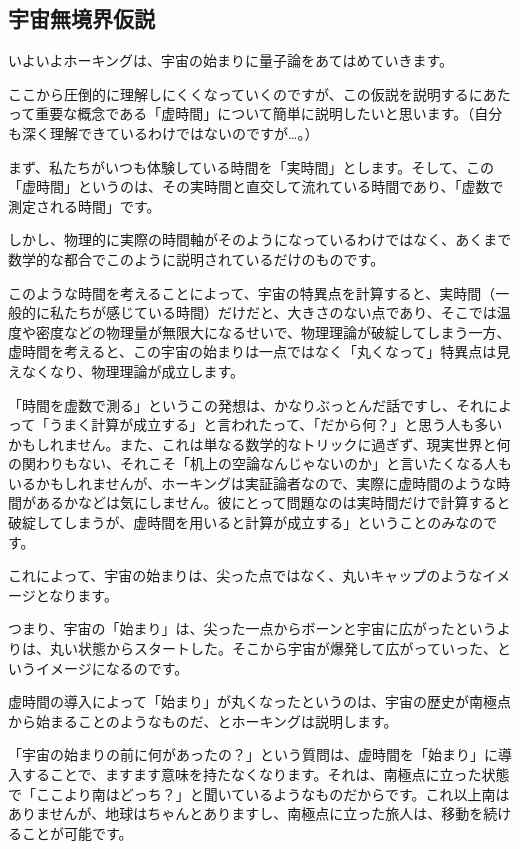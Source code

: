\documentclass[10pt,b5paper,papersize,dvipdfmx]{jsbook}
\begin{document}
\subsection{宇宙無境界仮説}
いよいよホーキングは、宇宙の始まりに量子論をあてはめていきます。\par
ここから圧倒的に理解しにくくなっていくのですが、この仮説を説明するにあたって重要な概念である「虚時間」について簡単に説明したいと思います。（自分も深く理解できているわけではないのですが…。）\par
まず、私たちがいつも体験している時間を「実時間」とします。そして、この「虚時間」というのは、その実時間と直交して流れている時間であり、「虚数で測定される時間」です。\par
しかし、物理的に実際の時間軸がそのようになっているわけではなく、あくまで数学的な都合でこのように説明されているだけのものです。\par
このような時間を考えることによって、宇宙の特異点を計算すると、実時間（一般的に私たちが感じている時間）だけだと、大きさのない点であり、そこでは温度や密度などの物理量が無限大になるせいで、物理理論が破綻してしまう一方、虚時間を考えると、この宇宙の始まりは一点ではなく「丸くなって」特異点は見えなくなり、物理理論が成立します。\par
「時間を虚数で測る」というこの発想は、かなりぶっとんだ話ですし、それによって「うまく計算が成立する」と言われたって、「だから何？」と思う人も多いかもしれません。また、これは単なる数学的なトリックに過ぎず、現実世界と何の関わりもない、それこそ「机上の空論なんじゃないのか」と言いたくなる人もいるかもしれませんが、ホーキングは実証論者なので、実際に虚時間のような時間があるかなどは気にしません。彼にとって問題なのは実時間だけで計算すると破綻してしまうが、虚時間を用いると計算が成立する」ということのみなのです。\par
これによって、宇宙の始まりは、尖った点ではなく、丸いキャップのようなイメージとなります。\par
つまり、宇宙の「始まり」は、尖った一点からボーンと宇宙に広がったというよりは、丸い状態からスタートした。そこから宇宙が爆発して広がっていった、というイメージになるのです。\par
虚時間の導入によって「始まり」が丸くなったというのは、宇宙の歴史が南極点から始まることのようなものだ、とホーキングは説明します。\par
「宇宙の始まりの前に何があったの？」という質問は、虚時間を「始まり」に導入することで、ますます意味を持たなくなります。それは、南極点に立った状態で「ここより南はどっち？」と聞いているようなものだからです。これ以上南はありませんが、地球はちゃんとありますし、南極点に立った旅人は、移動を続けることが可能です。\par
\end{document}
